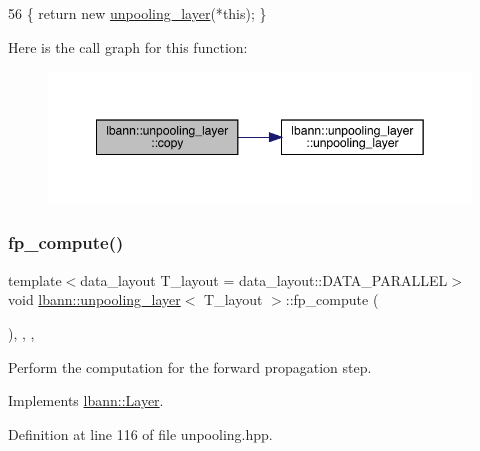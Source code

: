 \begin{DoxyCode}
56 \{ \textcolor{keywordflow}{return} \textcolor{keyword}{new} \hyperlink{classlbann_1_1unpooling__layer_a40055be5b45cb444581987395befc09a}{unpooling\_layer}(*\textcolor{keyword}{this}); \}
\end{DoxyCode}
Here is the call graph for this function\+:\nopagebreak
\begin{figure}[H]
\begin{center}
\leavevmode
\includegraphics[width=349pt]{classlbann_1_1unpooling__layer_ad8458ddba48f92e2b7b8e3bacd5c801e_cgraph}
\end{center}
\end{figure}
\mbox{\label{classlbann_1_1unpooling__layer_aad98d442d6f5ad1feb5f1d71bdb1df49}} 
\subsubsection{\texorpdfstring{fp\+\_\+compute()}{fp\_compute()}}
{\footnotesize\ttfamily template$<$data\+\_\+layout T\+\_\+layout = data\+\_\+layout\+::\+D\+A\+T\+A\+\_\+\+P\+A\+R\+A\+L\+L\+EL$>$ \\
void \hyperlink{classlbann_1_1unpooling__layer}{lbann\+::unpooling\+\_\+layer}$<$ T\+\_\+layout $>$\+::fp\+\_\+compute (\begin{DoxyParamCaption}{ }\end{DoxyParamCaption})\hspace{0.3cm}{\ttfamily [inline]}, {\ttfamily [override]}, {\ttfamily [protected]}, {\ttfamily [virtual]}}

Perform the computation for the forward propagation step. 

Implements \hyperlink{classlbann_1_1Layer_a523319dd1bd87a0612afa1912bb5aad7}{lbann\+::\+Layer}.



Definition at line 116 of file unpooling.\+hpp.


